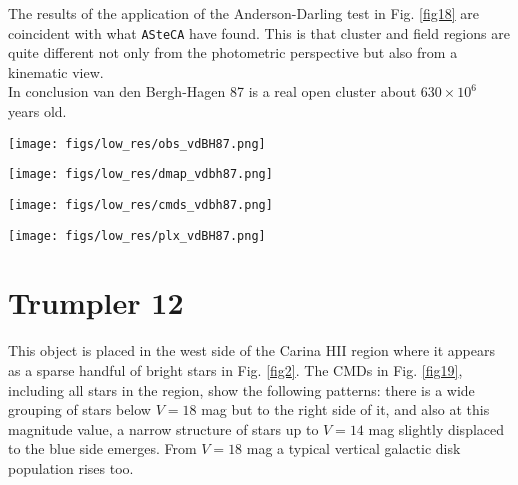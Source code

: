 \documentclass{aa}
\begin{document}
The results of the application of the Anderson-Darling test in Fig. \ref{fig18}
are coincident with what \texttt{ASteCA} have found. This is that cluster and
field regions are quite different not only from the photometric perspective but
also from a kinematic view.\\

In conclusion van den Bergh-Hagen 87 is a real open cluster about
$630\times10^6$ years old.

\begin{figure*}[ht]
    \centering
    \texttt{[image: figs/low\_res/obs\_vdBH87.png]}
    \caption{Idem Fig. \ref{fig3} for van den Bergh-Hagen 87.}
    \label{fig15}
\end{figure*}

\begin{figure*}[ht]
    \centering
    \texttt{[image: figs/low\_res/dmap\_vdbh87.png]}
    \caption{Idem Fig. \ref{fig4} for van den Bergh-Hagen 87.}
    \label{fig16}
\end{figure*}

\begin{figure*}[ht]
    \centering
    \texttt{[image: figs/low\_res/cmds\_vdbh87.png]}
    \caption{Idem Fig. \ref{fig5} for van den Bergh-Hagen 87.}
    \label{fig17}
\end{figure*}
\begin{figure*}[ht]
    \centering
    \texttt{[image: figs/low\_res/plx\_vdBH87.png]}
    \caption{Idem Fig. \ref{fig6} for van den Bergh-Hagen 87.}
    \label{fig18}
\end{figure*}




\section{Trumpler 12}

This object is placed in the west side of the Carina HII region where it appears
as a sparse handful of bright stars in Fig. \ref{fig2}. The CMDs in Fig.
\ref{fig19}, including all stars in the region, show the following patterns:
there is a wide grouping of stars below $V = 18$ mag but to the right side of
it, and also at this magnitude value, a narrow structure of stars up to $V= 14$
mag slightly displaced to the blue side emerges. From $V = 18$ mag a typical
vertical galactic disk population rises too.\\
\end{document}
